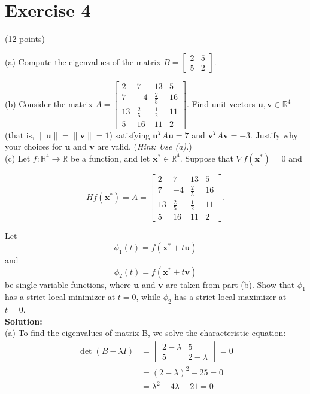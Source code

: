 \documentclass{article}
\begin{document}
\section*{Exercise 4}
(12 points)

(a) Compute the eigenvalues of the matrix $B = \begin{bmatrix} 2 & 5 \\ 5 & 2 \end{bmatrix}$.

(b) Consider the matrix $A = \begin{bmatrix} 2 & 7 & 13 & 5 \\ 7 & -4 & \frac{2}{5} & 16 \\ 13 & \frac{2}{5} & \frac{1}{2} & 11 \\ 5 & 16 & 11 & 2 \end{bmatrix}$. Find unit vectors $\mathbf{u}, \mathbf{v} \in \mathbb{R}^4$ (that is, $\|\mathbf{u}\| = \|\mathbf{v}\| = 1$) satisfying $\mathbf{u}^T A\mathbf{u} = 7$ and $\mathbf{v}^T A\mathbf{v} = -3$. Justify why your choices for $\mathbf{u}$ and $\mathbf{v}$ are valid.
(\textit{Hint: Use (a).}) \\

(c) Let $f: \mathbb{R}^4 \to \mathbb{R}$ be a function, and let $\mathbf{x}^* \in \mathbb{R}^4$. Suppose that $\nabla f(\mathbf{x}^*) = 0$ and

$$Hf(\mathbf{x}^*) = A = \begin{bmatrix} 2 & 7 & 13 & 5 \\ 7 & -4 & \frac{2}{5} & 16 \\ 13 & \frac{2}{5} & \frac{1}{2} & 11 \\ 5 & 16 & 11 & 2 \end{bmatrix}.$$

Let $$\phi_1(t) = f(\mathbf{x}^* + t\mathbf{u})$$ and $$\phi_2(t) = f(\mathbf{x}^* + t\mathbf{v})$$ be single-variable functions, where $\mathbf{u}$ and $\mathbf{v}$ are taken from part (b). Show that $\phi_1$ has a strict local minimizer at $t = 0$, while $\phi_2$ has a strict local maximizer at $t = 0$. \\

\textbf{Solution: } \\

(a) To find the eigenvalues of matrix B, we solve the characteristic equation:
\begin{align*}
\det(B - \lambda I) &= \begin{vmatrix} 2-\lambda & 5 \\ 5 & 2-\lambda \end{vmatrix} = 0 \\
&= (2-\lambda)^2 - 25 = 0 \\
&= \lambda^2 - 4\lambda - 21 = 0
\end{align*}
\end{document}
